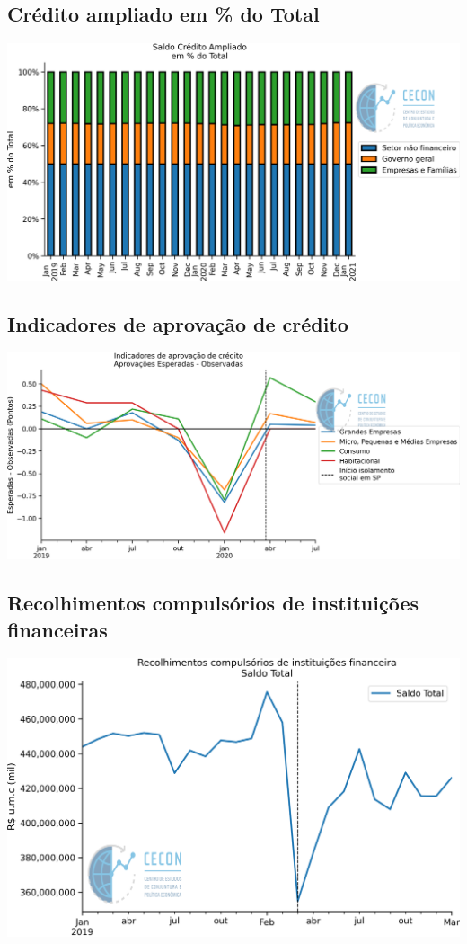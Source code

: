 \documentclass{SelfArx}
\begin{document}
\subsection*{Crédito ampliado em \% do Total}
\label{sec:org6af6ff0}

\begin{center}
\includegraphics[width=.9\linewidth]{./figs/Credito/SaldoCreditoAmpliado_Total.png}
\end{center}

\subsection*{Indicadores de aprovação de crédito}
\label{sec:org4b05186}

\begin{center}
\includegraphics[width=.9\linewidth]{./figs/Credito/PTC.png}
\end{center}

\subsection*{Recolhimentos compulsórios de instituições financeiras}
\label{sec:org8ce43c9}

\begin{center}
\includegraphics[width=.9\linewidth]{./figs/Credito/Recolhimentos_Total.png}
\end{center}
\end{document}
